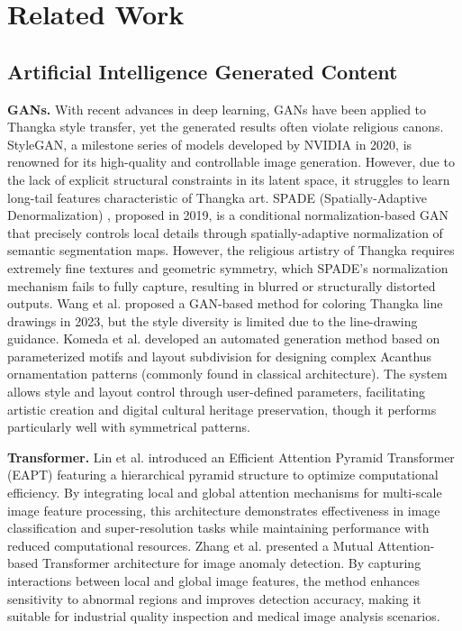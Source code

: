 \documentclass[sn-mathphys]{sn-jnl}%
\theoremstyle{thmstyleone}%
\theoremstyle{thmstyletwo}%
\theoremstyle{thmstylethree}%
\begin{document}
\section{Related Work}
\subsection{Artificial Intelligence Generated Content}
\textbf{GANs. }With recent advances in deep learning, GANs have been applied to Thangka style transfer, yet the generated results often violate religious canons. StyleGAN\cite{b13}, a milestone series of models developed by NVIDIA in 2020, is renowned for its high-quality and controllable image generation. However, due to the lack of explicit structural constraints in its latent space, it struggles to learn long-tail features characteristic of Thangka art. SPADE (Spatially-Adaptive Denormalization) \cite{b14}, proposed in 2019, is a conditional normalization-based GAN that precisely controls local details through spatially-adaptive normalization of semantic segmentation maps. However, the religious artistry of Thangka requires extremely fine textures and geometric symmetry, which SPADE's normalization mechanism fails to fully capture, resulting in blurred or structurally distorted outputs. Wang et al.\cite{b15} proposed a GAN-based method for coloring Thangka line drawings in 2023, but the style diversity is limited due to the line-drawing guidance. Komeda et al.\cite{b16} developed an automated generation method based on parameterized motifs and layout subdivision for designing complex Acanthus ornamentation patterns (commonly found in classical architecture). The system allows style and layout control through user-defined parameters, facilitating artistic creation and digital cultural heritage preservation, though it performs particularly well with symmetrical patterns.

\textbf{Transformer. }Lin et al.\cite{b17} introduced an Efficient Attention Pyramid Transformer (EAPT) featuring a hierarchical pyramid structure to optimize computational efficiency. By integrating local and global attention mechanisms for multi-scale image feature processing, this architecture demonstrates effectiveness in image classification and super-resolution tasks while maintaining performance with reduced computational resources. Zhang et al.\cite{b18} presented a Mutual Attention-based Transformer architecture for image anomaly detection. By capturing interactions between local and global image features, the method enhances sensitivity to abnormal regions and improves detection accuracy, making it suitable for industrial quality inspection and medical image analysis scenarios.
\end{document}

